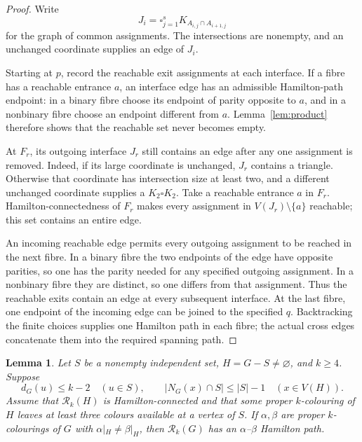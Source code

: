 \documentclass[11pt]{article}
\newtheorem{lemma}[theorem]{Lemma}
\theoremstyle{remark}
\newcommand{\Rk}{\mathcal R_k}
\numberwithin{equation}{section}
\numberwithin{table}{section}
\begin{document}
\begin{proof}
Write
\[
 J_i=\square_{j=1}^s K_{A_{i,j}\cap A_{i+1,j}}
\]
for the graph of common assignments.  The intersections are nonempty,
and an unchanged coordinate supplies an edge of $J_i$.

Starting at $p$, record the reachable exit assignments at each
interface.  If a fibre has a reachable entrance $a$, an interface edge
has an admissible Hamilton-path endpoint: in a binary fibre choose its
endpoint of parity opposite to $a$, and in a nonbinary fibre choose an
endpoint different from $a$.  Lemma~\ref{lem:product} therefore shows
that the reachable set never becomes empty.

At $F_r$, its outgoing interface $J_r$ still contains an edge after any
one assignment is removed.  Indeed, if its large coordinate is
unchanged, $J_r$ contains a triangle.  Otherwise that coordinate has
intersection size at least two, and a different unchanged coordinate
supplies a $K_2\square K_2$.  Take a reachable entrance $a$ in $F_r$.
Hamilton-connectedness of $F_r$ makes every assignment in
$V(J_r)\setminus\{a\}$ reachable; this set contains an entire edge.

An incoming reachable edge permits every outgoing assignment to be
reached in the next fibre.  In a binary fibre the two endpoints of the
edge have opposite parities, so one has the parity needed for any
specified outgoing assignment.  In a nonbinary fibre they are distinct,
so one differs from that assignment.  Thus the reachable exits contain
an edge at every subsequent interface.  At the last fibre, one endpoint
of the incoming edge can be joined to the specified $q$.  Backtracking
the finite choices supplies one Hamilton path in each fibre; the actual
cross edges concatenate them into the required spanning path.
\end{proof}

\begin{lemma}
\label{lem:independent-hc}
Let $S$ be a nonempty independent set, $H=G-S\ne\varnothing$, and
$k\ge4$.  Suppose
\[
 d_G(u)\le k-2\quad(u\in S),\qquad
 |N_G(x)\cap S|\le |S|-1\quad(x\in V(H)).
\]
Assume that $\Rk(H)$ is Hamilton-connected and that some proper
$k$-colouring of $H$ leaves at least three colours available at a vertex
of $S$.  If $\alpha,\beta$ are proper $k$-colourings of $G$ with
$\alpha|_H\ne\beta|_H$, then $\Rk(G)$ has an
$\alpha$--$\beta$ Hamilton path.
\end{lemma}
\end{document}
